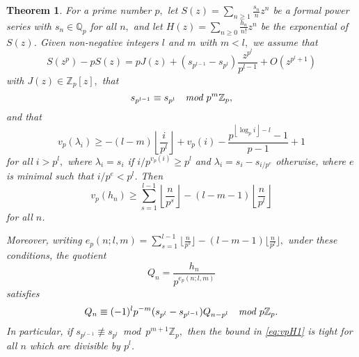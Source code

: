 \documentclass[12pt,reqno]{amsart}
\numberwithin{equation}{section}
\newtheorem{theorem}{Theorem}
\theoremstyle{remark}
\begin{document}
\begin{theorem} \label{thm:pdiv1}
For a prime number $p,$
let\/ $S(z)=\sum_{n\ge1}\frac {s_n} {n}z^n$ be a formal power series
with $s_n\in{\mathbb{Q}}_p$ for all $n,$ and let 
$H(z)=\sum_{n\ge0}\frac {h_n} {n!}z^n$ be the exponential of $S(z)$.
Given non-negative integers $l$ and $m$ with $m<l,$ we assume that
\begin{equation} \label{eq:pS1}
S(z^{p})-pS(z)=pJ(z)+(s_{p^{l-1}}-s_{p^l})\frac {z^{p^l}} {p^{l-1}}
+O\left(z^{p^{l}+1}\right) 
\end{equation}
with $J(z)\in {\mathbb{Z}}_p[z],$ that
\begin{equation} \label{eq:p^m} 
s_{p^{l-1}}\equiv s_{p^{l}}\quad 
\text{\em mod~$p^{m}{\mathbb{Z}}_p$},
\end{equation}
and that
\begin{equation} \label{eq:sdiff} 
v_p({\lambda}_{i})\ge -(l-m){\left\lfloor{\frac {i} {p^{l}}}\right\rfloor}
+v_p(i)-\frac {p^{{\left\lfloor{\log_pi}\right\rfloor}-l}-1} {p-1}+1
\end{equation}
for all $i>p^{l},$ where ${\lambda}_i=s_i$ if $i/p^{v_p(i)}\ge p^l$
and ${\lambda}_i=s_i-s_{i/p^{e}}$ otherwise, where $e$ is minimal such
that $i/p^e< p^l$. 
Then
\begin{equation} \label{eq:vpH1}
v_p(h_n)\ge \sum_{s=1}^{l-1} {\left\lfloor{\frac{n}{p^s}}\right\rfloor}
-(l-m-1){\left\lfloor{\frac {n} {p^l}}\right\rfloor}
\end{equation}
for all $n$.

Moreover, writing 
$e_p(n;l,m)=\sum_{s=1}^{l-1}\big\lfloor\frac {n} {p^{s}}\big\rfloor
-(l-m-1)\big\lfloor\frac {n} {p^l}\big\rfloor,$ 
under these conditions, the quotient
\begin{equation} \label{eq:quot}
Q_n=\frac {h_n} 
{p^{e_p(n;l,m)}}
\end{equation}
satisfies
\begin{equation} \label{eq:Qrek1} 
Q_n\equiv (-1)^lp^{-m}(s_{p^l}-s_{p^{l-1}})Q_{n-p^l} 
\quad \text{\em mod $p{\mathbb{Z}}_p$}.
\end{equation}
In particular, if 
\hbox{$s_{p^{l-1}}\not\equiv s_{p^{l}}$~{\em mod~$p^{m+1}{\mathbb{Z}}_p,$}}
then the bound in \eqref{eq:vpH1} is tight for all $n$ which are
divisible by $p^l$.
\end{theorem}
\end{document}
